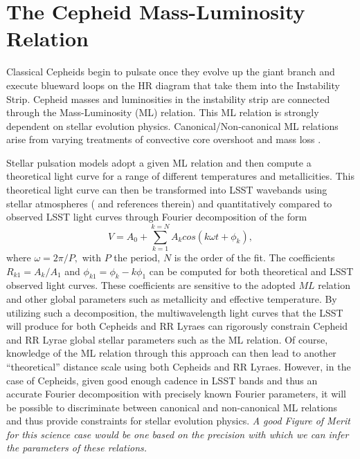 %
%
%

\section{The Cepheid Mass-Luminosity Relation}
\def\secname{cepheids}\label{sec:\secname}

Classical Cepheids begin to pulsate once they evolve up the giant branch and
execute blueward loops on the HR diagram that take them into the Instability
Strip. Cepheid masses and luminosities in the instability strip are connected
through the Mass-Luminosity (ML) relation.  This ML relation is strongly
dependent on stellar evolution physics. Canonical/Non-canonical ML relations
arise from varying treatments of convective core overshoot and mass loss
\citep{1992A&A...258..397B,2000ApJ...529..293B,2013ApJ...768L...6M}.

Stellar pulsation models adopt a given ML relation and then compute a
theoretical light curve for a range of different temperatures and
metallicities. This theoretical light curve can then be transformed into LSST
wavebands using stellar atmospheres (\citep{Bono2000} and references therein) and
quantitatively compared to observed LSST light curves through Fourier
decomposition of the form
$$V = A_0 + \sum_{k=1}^{k=N}A_k cos(k\omega t + {\phi}_k),$$
where $\omega = 2\pi/P,$ with $P$ the period, $N$ is the order of the fit. The
coefficients $R_{k1}=A_k/A_1$ and ${\phi}_{k1}={\phi}_k - k{\phi}_1$ can be
computed for both theoretical and LSST observed light curves. These
coefficients are sensitive to the adopted $ML$ relation and other global
parameters such as metallicity and effective temperature.  By utilizing such a
decomposition, the multiwavelength light curves that the LSST will produce for
both Cepheids and RR Lyraes can rigorously constrain Cepheid and RR Lyrae
global stellar parameters such as the ML relation. Of course, knowledge of the
ML relation through this approach can then lead to another ``theoretical''
distance scale using both Cepheids and RR Lyraes.  However, in the case of
Cepheids, given good enough cadence in LSST bands and thus an accurate Fourier
decomposition with precisely known Fourier parameters, it will be possible to
discriminate between canonical and non-canonical ML relations and thus provide
constraints for stellar evolution physics. {\it A good Figure of Merit for
this science case would be one based on the precision with which
we can infer the parameters of these relations.}

